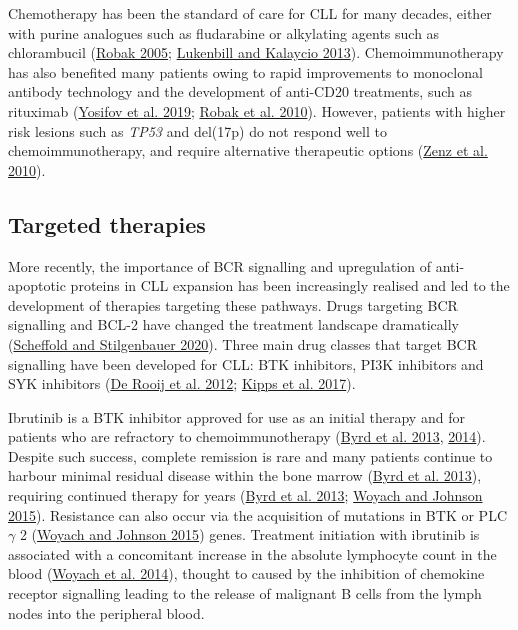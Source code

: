 \documentclass[11pt, a4paper, twosided]{book}
\begin{document}
Chemotherapy has been the standard of care for CLL for many decades, either with purine analogues such as fludarabine or alkylating agents such as chlorambucil (\protect\hyperlink{ref-Robak2005}{Robak 2005}; \protect\hyperlink{ref-Lukenbill2013}{Lukenbill and Kalaycio 2013}). Chemoimmunotherapy has also benefited many patients owing to rapid improvements to monoclonal antibody technology and the development of anti-CD20 treatments, such as rituximab (\protect\hyperlink{ref-Yosifov2019}{Yosifov et al. 2019}; \protect\hyperlink{ref-Robak2010}{Robak et al. 2010}). However, patients with higher risk lesions such as \emph{TP53} and del(17p) do not respond well to chemoimmunotherapy, and require alternative therapeutic options (\protect\hyperlink{ref-Zenz2010}{Zenz et al. 2010}).

\hypertarget{intro-targeted-therapies}{%
\subsection{Targeted therapies}\label{intro-targeted-therapies}}

More recently, the importance of BCR signalling and upregulation of anti-apoptotic proteins in CLL expansion has been increasingly realised and led to the development of therapies targeting these pathways. Drugs targeting BCR signalling and BCL-2 have changed the treatment landscape dramatically (\protect\hyperlink{ref-Scheffold2020}{Scheffold and Stilgenbauer 2020}). Three main drug classes that target BCR signalling have been developed for CLL: BTK inhibitors, PI3K inhibitors and SYK inhibitors (\protect\hyperlink{ref-Rooij2012}{De Rooij et al. 2012}; \protect\hyperlink{ref-Kipps2017}{Kipps et al. 2017}).

Ibrutinib is a BTK inhibitor approved for use as an initial therapy and for patients who are refractory to chemoimmunotherapy (\protect\hyperlink{ref-Byrd2013}{Byrd et al. 2013}, \protect\hyperlink{ref-Byrd2014}{2014}). Despite such success, complete remission is rare and many patients continue to harbour minimal residual disease within the bone marrow (\protect\hyperlink{ref-Byrd2013}{Byrd et al. 2013}), requiring continued therapy for years (\protect\hyperlink{ref-Byrd2013}{Byrd et al. 2013}; \protect\hyperlink{ref-Woyach2015}{Woyach and Johnson 2015}). Resistance can also occur via the acquisition of mutations in BTK or PLC\(\gamma\) 2 (\protect\hyperlink{ref-Woyach2015}{Woyach and Johnson 2015}) genes. Treatment initiation with ibrutinib is associated with a concomitant increase in the absolute lymphocyte count in the blood (\protect\hyperlink{ref-Woyach2014}{Woyach et al. 2014}), thought to caused by the inhibition of chemokine receptor signalling leading to the release of malignant B cells from the lymph nodes into the peripheral blood.
\end{document}
